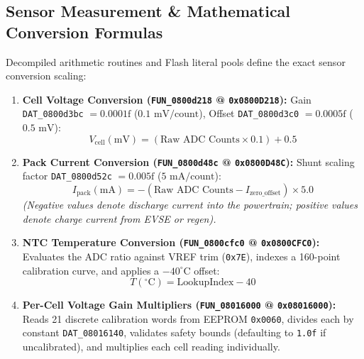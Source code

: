\documentclass[10pt,a4paper]{article}
\begin{document}
\subsection{Sensor Measurement \& Mathematical Conversion Formulas}
Decompiled arithmetic routines and Flash literal pools define the exact sensor conversion scaling:
\begin{enumerate}
    \item \textbf{Cell Voltage Conversion (\texttt{FUN\_0800d218} @ \texttt{0x0800D218}):}
    Gain \texttt{DAT\_0800d3bc} $= 0.0001\text{f}$ ($0.1\text{ mV/count}$), Offset \texttt{DAT\_0800d3c0} $= 0.0005\text{f}$ ($0.5\text{ mV}$):
    \begin{equation}
        V_{\text{cell}} (\text{mV}) = (\text{Raw ADC Counts} \times 0.1) + 0.5
    \end{equation}
    \item \textbf{Pack Current Conversion (\texttt{FUN\_0800d48c} @ \texttt{0x0800D48C}):}
    Shunt scaling factor \texttt{DAT\_0800d52c} $= 0.005\text{f}$ ($5\text{ mA/count}$):
    \begin{equation}
        I_{\text{pack}} (\text{mA}) = -(\text{Raw ADC Counts} - I_{\text{zero\_offset}}) \times 5.0
    \end{equation}
    \textit{(Negative values denote discharge current into the powertrain; positive values denote charge current from EVSE or regen).}
    \item \textbf{NTC Temperature Conversion (\texttt{FUN\_0800cfc0} @ \texttt{0x0800CFC0}):}
    Evaluates the ADC ratio against VREF trim (\texttt{0x7E}), indexes a 160-point calibration curve, and applies a $-40^\circ\text{C}$ offset:
    \begin{equation}
        T (^\circ\text{C}) = \text{LookupIndex} - 40
    \end{equation}
    \item \textbf{Per-Cell Voltage Gain Multipliers (\texttt{FUN\_08016000} @ \texttt{0x08016000}):}
    Reads 21 discrete calibration words from EEPROM \texttt{0x0060}, divides each by constant \texttt{DAT\_08016140}, validates safety bounds (defaulting to \texttt{1.0f} if uncalibrated), and multiplies each cell reading individually.
\end{enumerate}
\end{document}
